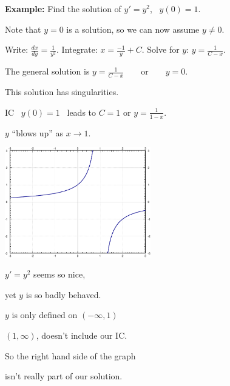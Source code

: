 \documentclass[10pt,aspectratio=169]{beamer}
\begin{document}
\begin{frame}
\textbf{Example:}
Find the solution of
$y' = y^2$,~ $y(0)=1$.

\medskip
\pause

Note that $y=0$ is a solution, so we can now assume $y \not= 0$.

\medskip
\pause

Write:
\quad
$\displaystyle
\frac{dx}{dy} = \frac{1}{y^2}$.
\qquad
\pause
Integrate:
\quad
$\displaystyle
x = \frac{-1}{y} + C$.
\qquad
\pause
Solve for $y$:
\quad
$\displaystyle
y = \frac{1}{C-x}$.

\medskip
\pause

The general solution is
\quad
$\displaystyle
y = \frac{1}{C-x} \qquad \text{or} \qquad y = 0$.

\medskip
\pause

This solution has singularities.

\medskip
\pause

IC ~$y(0)=1$~ leads 
to $C=1$ or $y = \frac{1}{1-x}$.

\medskip
\pause

$y$ ``blows up'' as $x\to 1$.

\vspace*{-0.7in}
\hspace*{2.5in}%
\includegraphics[width=2.5in]{../figures/1over1mx}

\vspace*{-1.15in}
\pause

$y'=y^2$ seems so nice,

yet $y$ is so badly behaved.

\medskip
\pause

$y$ is only defined on $(-\infty,1)$

\medskip
\pause

$(1,\infty)$, doesn't include our
IC.

\medskip
\pause

So the right hand side of the graph

isn't really part of our solution.
\end{frame}
\end{document}
